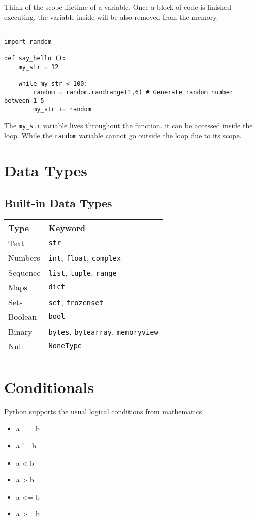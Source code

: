 \documentclass[11pt]{article}
\begin{document}
Think of the scope lifetime of a variable.
Once a block of code is finished executing, the variable inside will be also removed from the memory. 

\begin{verbatim}

import random

def say_hello ():
    my_str = 12

    while my_str < 100:
        random = random.randrange(1,6) # Generate random number between 1-5
        my_str += random

\end{verbatim}

The \texttt{my\_str} variable lives throughout the function. it can be accessed inside the loop. While the \texttt{random} variable cannot go outside the loop due to its scope.

\section{Data Types}
\label{sec:org18f55ba}
\subsection{Built-in Data Types}
\label{sec:org5de7405}
\begin{center}
\begin{tabular}{ll}
Type & Keyword\\[0pt]
\hline
Text & \texttt{str}\\[0pt]
Numbers & \texttt{int}, \texttt{float}, \texttt{complex}\\[0pt]
Sequence & \texttt{list}, \texttt{tuple}, \texttt{range}\\[0pt]
Maps & \texttt{dict}\\[0pt]
Sets & \texttt{set}, \texttt{frozenset}\\[0pt]
Boolean & \texttt{bool}\\[0pt]
Binary & \texttt{bytes}, \texttt{bytearray}, \texttt{memoryview}\\[0pt]
Null & \texttt{NoneType}\\[0pt]
 & \\[0pt]
\end{tabular}
\end{center}

\section{Conditionals}
\label{sec:orga9fd81b}
Python supports the usual logical conditions from mathematics
\begin{itemize}
\item a == b
\item a != b
\item a < b
\item a > b
\item a <= b
\item a >= b
\end{itemize}
\end{document}

